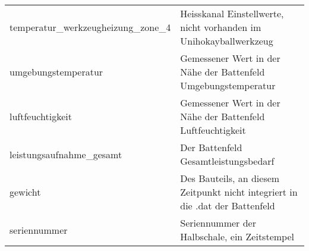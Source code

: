 \begin{longtable}{|p{4cm}|p{10cm}|}
  temperatur\_werkzeugheizung\_zone\_4 & Heisskanal Einstellwerte, nicht vorhanden im Unihokayballwerkzeug \\
  umgebungstemperatur & Gemessener Wert in der Nähe der Battenfeld Umgebungstemperatur \\
  luftfeuchtigkeit & Gemessener Wert in der Nähe der Battenfeld Luftfeuchtigkeit \\
  leistungsaufnahme\_gesamt & Der Battenfeld Gesamtleistungsbedarf \\
  gewicht & Des Bauteils, an diesem Zeitpunkt nicht integriert in die .dat der Battenfeld \\
  seriennummer & Seriennummer der Halbschale, ein Zeitstempel \\
  \hline
\end{longtable}
